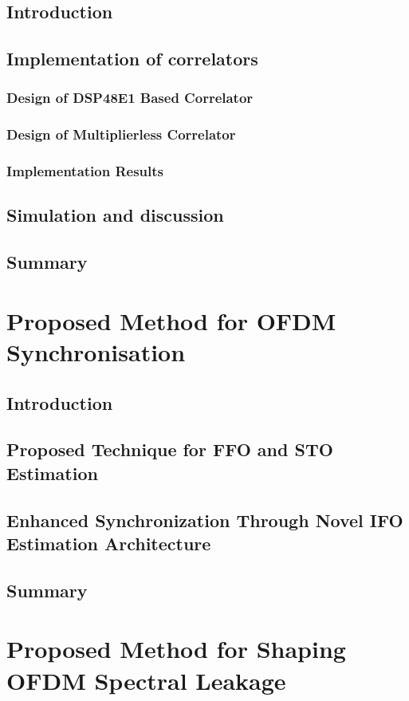 	\section{Introduction}
	\section{Implementation of correlators}
		\subsection{Design of DSP48E1 Based Correlator}
		\subsection{Design of Multiplierless Correlator}
		\subsection{Implementation Results}
	\section{Simulation and discussion}
	\section{Summary}
%
\chapter{Proposed Method for OFDM Synchronisation}
\label{chap:Synchronisation}
	\section{Introduction}
	\section{Proposed Technique for FFO and STO Estimation}
	\section{Enhanced Synchronization Through Novel IFO Estimation Architecture}
	\section{Summary}
%
\chapter{Proposed Method for Shaping OFDM Spectral Leakage}
\label{chap:SpectralLeakage}
